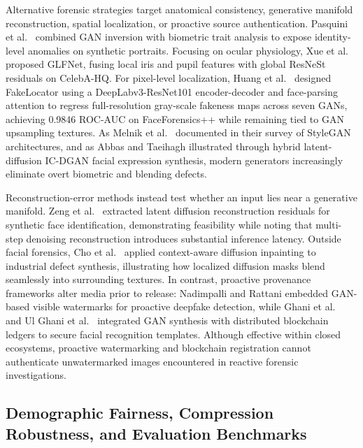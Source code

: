 \documentclass[final,5p,times,twocolumn,numafflabel]{elsarticle}
\begin{document}
Alternative forensic strategies target anatomical consistency, generative manifold reconstruction, spatial localization, or proactive source authentication. Pasquini et al.\ \cite{Pasquini_2023} combined GAN inversion with biometric trait analysis to expose identity-level anomalies on synthetic portraits. Focusing on ocular physiology, Xue et al.\ \cite{Xue_2023} proposed GLFNet, fusing local iris and pupil features with global ResNeSt residuals on CelebA-HQ. For pixel-level localization, Huang et al.\ \cite{Huang_2022} designed FakeLocator using a DeepLabv3-ResNet101 encoder-decoder and face-parsing attention to regress full-resolution gray-scale fakeness maps across seven GANs, achieving 0.9846 ROC-AUC on FaceForensics++ while remaining tied to GAN upsampling textures. As Melnik et al.\ \cite{Melnik_2024} documented in their survey of StyleGAN architectures, and as Abbas and Taeihagh \cite{Abbas_2026} illustrated through hybrid latent-diffusion IC-DGAN facial expression synthesis, modern generators increasingly eliminate overt biometric and blending defects.

Reconstruction-error methods instead test whether an input lies near a generative manifold. Zeng et al.\ \cite{Zeng_2025} extracted latent diffusion reconstruction residuals for synthetic face identification, demonstrating feasibility while noting that multi-step denoising reconstruction introduces substantial inference latency. Outside facial forensics, Cho et al.\ \cite{Cho_2026} applied context-aware diffusion inpainting to industrial defect synthesis, illustrating how localized diffusion masks blend seamlessly into surrounding textures. In contrast, proactive provenance frameworks alter media prior to release: Nadimpalli and Rattani \cite{Nadimpalli_2024} embedded GAN-based visible watermarks for proactive deepfake detection, while Ghani et al.\ \cite{Ghani_2024} and Ul Ghani et al.\ \cite{Ul_Ghani_2024} integrated GAN synthesis with distributed blockchain ledgers to secure facial recognition templates. Although effective within closed ecosystems, proactive watermarking and blockchain registration cannot authenticate unwatermarked images encountered in reactive forensic investigations.

\subsection{Demographic Fairness, Compression Robustness, and Evaluation Benchmarks}
\end{document}
